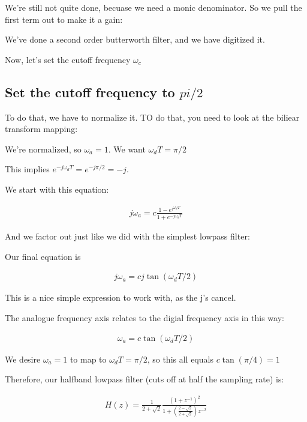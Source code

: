 
We're still not quite done, becuase we need a monic denominator. So we pull
the first term out to make it a gain:


We've done a second order butterworth filter, and we have digitized it.

Now, let's set the cutoff frequency $\omega_c$

\subsection*{Set the cutoff frequency to $pi/2$}

To do that, we have to normalize it. TO do that, you need to look
at the biliear transform mapping:


We're normalized, so $\omega_a = 1$. We want $\omega_d T = \pi/2$

This implies $e^{-j\omega_d T} = e^{-j\pi/2} = -j$.

We start with this equation:

\begin{align*}
j\omega_a = c \frac{1 - e^{_j\omega_d T}}{1 + e^{-j \omega_d T}}
\end{align*}

And we factor out just like we did with the simplest lowpass filter:


Our final equation is

\begin{align*}
j\omega_a = c j \tan(\omega_d T / 2)
\end{align*}

This is a nice simple expression to work with, as the j's cancel. 

The analogue frequency axis relates to the digial frequency axis in this way:

\begin{align*}
\omega_a = c \tan(\omega_d T / 2)
\end{align*}

We desire $\omega_a = 1$  to map to $\omega_dT = \pi / 2$, so this all equals
$c \tan(\pi/4) = 1$

Therefore, our halfband lowpass filter (cuts off at half the sampling rate) is:

\begin{align*}
H(z) = \frac{1}{2 + \sqrt{2}} \frac{(1+ z^{-1})^2} {1 + 
(\frac{2 - \sqrt{2}}{2 + \sqrt{2}})z^{-2}
}
\end{align*}

